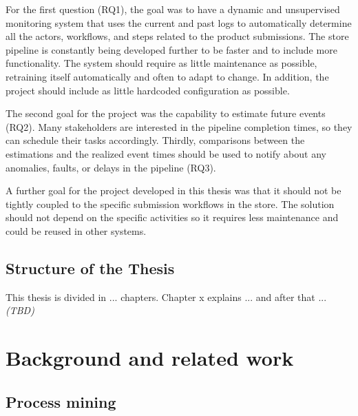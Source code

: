 \documentclass[english,12pt,a4paper,pdftex,sci,utf8]{aaltothesis}
\theoremstyle{definition}
\newcommand{\nyi}[1]{\noindent\colorbox{nyibg}{\textcolor{nyitext}{\emph{#1}}}}
\begin{document}
For the first question (RQ1), the goal was to have a dynamic and unsupervised monitoring system 
that uses the current and past logs to automatically determine all the actors, 
workflows, and steps related to the product submissions.
The store pipeline is constantly being developed further to be faster and to include more functionality.
The system should require as little maintenance as possible, retraining itself automatically and often to adapt to change.
In addition, the project should include as little hardcoded configuration as possible.

The second goal for the project was the capability to estimate future events (RQ2). 
Many stakeholders are interested in the pipeline completion times, so they can schedule their tasks accordingly.
Thirdly, comparisons between the estimations and the realized event times should be used to notify 
about any anomalies, faults, or delays in the pipeline (RQ3).

A further goal for the project developed in this thesis was that it should not be tightly coupled to the 
specific submission workflows in the store. The solution should not depend on the specific activities so
it requires less maintenance and could be reused in other systems.

\subsection{Structure of the Thesis}
This thesis is divided in ... chapters. Chapter x explains ... and after that ... 
\nyi{(TBD)}


\clearpage
\section{Background and related work}
\label{sec:background}

\subsection{Process mining}
\end{document}
